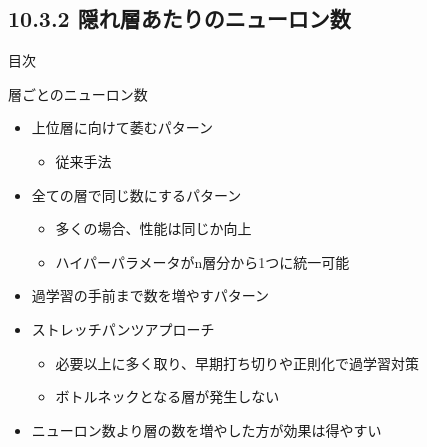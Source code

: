 \documentclass[aspectratio=169, dvipdfmx, 14pt, xcolor={svgnames,dvipsnames}]{beamer}
\def\tightlist{\itemsep1pt\parskip0pt\parsep0pt}
\begin{document}

\hypertarget{ux96a0ux308cux5c64ux3042ux305fux308aux306eux30cbux30e5ux30fcux30edux30f3ux6570}{%
  \subsection{10.3.2
    隠れ層あたりのニューロン数}\label{ux96a0ux308cux5c64ux3042ux305fux308aux306eux30cbux30e5ux30fcux30edux30f3ux6570}}
\begin{frame}{\quad 目次}
  \tableofcontents[currentsubsection]
\end{frame}


\begin{frame}{\quad 層ごとのニューロン数}
  \begin{itemize}
    \tightlist
    \item
          上位層に向けて萎むパターン

          \begin{itemize}
            \tightlist
            \item
                  従来手法
          \end{itemize}
    \item
          全ての層で同じ数にするパターン

          \begin{itemize}
            \tightlist
            \item
                  多くの場合、性能は同じか向上
            \item
                  ハイパーパラメータがn層分から1つに統一可能
          \end{itemize}
    \item
          過学習の手前まで数を増やすパターン
    \item
          ストレッチパンツアプローチ

          \begin{itemize}
            \tightlist
            \item
                  必要以上に多く取り、早期打ち切りや正則化で過学習対策
            \item
                  ボトルネックとなる層が発生しない
          \end{itemize}
    \item
          \alert{ニューロン数より層の数を増やした方が効果は得やすい}
  \end{itemize}
\end{frame}
\end{document}
